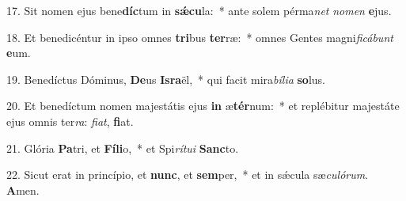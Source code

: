 17. Sit nomen ejus bene\textbf{díc}tum in \textbf{sǽ}\textbf{cu}la:~*  ante solem pérma\textit{net} \textit{no}\textit{men} \textbf{e}jus.\

18. Et benedicéntur in ipso omnes \textbf{tri}bus \textbf{ter}ræ:~*  omnes Gentes magni\textit{fi}\textit{cá}\textit{bunt} \textbf{e}um.\

19. Benedíctus Dóminus, \textbf{De}us \textbf{Is}\textbf{ra}ël,~*  qui facit mira\textit{bí}\textit{li}\textit{a} \textbf{so}lus.\

20. Et benedíctum nomen majestátis ejus \textbf{in} æ\textbf{tér}num:~*  et replébitur majestáte ejus omnis ter\textit{ra}: \textit{fi}\textit{at}, \textbf{fi}at.\

21. Glória \textbf{Pa}tri, et \textbf{Fí}\textbf{li}o,~*  et Spi\textit{rí}\textit{tu}\textit{i} \textbf{Sanc}to.\

22. Sicut erat in princípio, et \textbf{nunc}, et \textbf{sem}per,~*  et in sǽcula sæ\textit{cu}\textit{ló}\textit{rum}. \textbf{A}men.\

